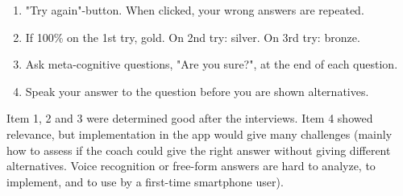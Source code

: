   \begin{enumerate}
  \item "Try again"-button. When clicked, your wrong answers are repeated.
  \item If 100\% on the 1st try, gold. On 2nd try: silver. On 3rd try: bronze.
  \item Ask meta-cognitive questions, "Are you sure?", at the end of each question.
  \item Speak your answer to the question before you are shown alternatives.
  \end{enumerate}

  Item 1, 2 and 3 were determined good after the interviews. Item 4 showed relevance, but implementation in the app would give many challenges (mainly how to assess if the coach could give the right answer without giving different alternatives. Voice recognition or free-form answers are hard to analyze, to implement, and to use by a first-time smartphone user).

  \clearpage
